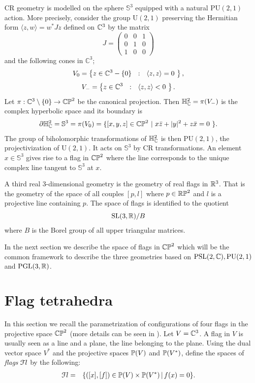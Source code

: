  CR geometry is modelled on the sphere ${\mathbb S}^3$ equipped with a natural $\mathrm{PU}(2,1)$ action.  More precisely, consider the group $\mathrm{U}(2,1)$ preserving the Hermitian form
$\langle z,w \rangle = w^*Jz$ defined on ${\bC}^{3}$ by
the matrix
$$
J=\left ( \begin{array}{ccc}

                        0      &  0    &       1 \\

                        0       &  1    &       0\\

                        1       &  0    &       0

                \end{array} \right )
$$
and the following cones in ${\mathbb C}^{3}$;
$$
        V_0 = \left\{ z\in {\bC}^{3}-\{0\}\ \ :\ \
 \langle z,z\rangle = 0 \ \right\},
$$
$$
        V_-   = \left\{ z\in {\bC}^{3}\ \ :\ \ \langle z,z\rangle < 0
\ \right\}.
$$
Let $\pi :{\bC}^{3}\setminus\{ 0\} \rightarrow \mathbb{CP}^{2}$ be the
canonical projection.  Then
${\mathbb H}_{\bC}^{2} = \pi(V_-)$ is the complex hyperbolic space and its boundary is
$$
\partial{\mathbb H}_{\bC}^{2} ={\mathbb S}^3= \pi(V_0)=\{ [x,y,z]\in \mathbb{CP}^{2}\ |\ x\bar z+ |y|^2+z\bar x=0\ \}.
$$
The group of biholomorphic transformations of ${\mathbb H}_{\bC}^{2}$ is then
$\mathrm{PU}(2,1)$, the projectivization of $\mathrm{U}(2,1)$.  It acts on ${\mathbb S}^3$ by
CR transformations.
An element $x\in {\mathbb S}^3$ gives rise to a flag in ${\CP}^{2}$ where the line corresponds to the unique complex line tangent to ${\mathbb S}^3$ at $x$.

A third real 3-dimensional geometry is the geometry of real flags in $\bR^3$.  That is the geometry of the space of all couples $[p,l]$ where $p\in \RP^2$ and $l$ is a projective line
containing $p$.  The space of flags is identified to the quotient
$$
\SL(3,\bR)/B
$$
where $B$ is the Borel group of all upper triangular matrices.

In the next section we describe the space of flags in $\CP^2$ which will be the common framework to describe the three geometries based on
$\PSL(2,\bC), \PU(2,1)$ and $\PGL(3,\bR)$.

\section{Flag tetrahedra}\label{ss:coord-para}


In this section we  recall the parametrization  of configurations of four flags in the projective space $ \CP^2$ (more details can be seen in \cite{BFG}).
Let $V=\bC^3$. A flag in $V$ is usually seen as a line and a plane, the line belonging to the plane.  Using the dual vector space $V^*$ and the projective spaces $\P(V)$ and $\P(V^*)$,
define the spaces of  {\it flags} $\Fl$ by the following:
\begin{eqnarray*}
 \Fl & = & \{([x],[f])\in \P(V)\times \P(V^*) \, | \, f(x)=0\}.
\end{eqnarray*}


